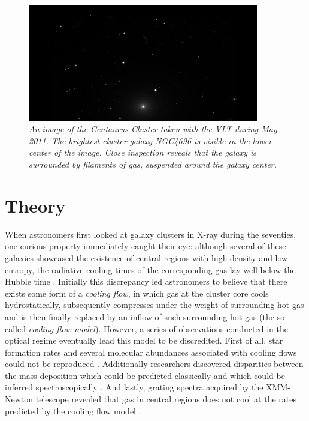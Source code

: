 \documentclass[twoside,single]{lion-msc}
\begin{document}
        \begin{figure}[h]
      \centering
        \includegraphics[width=0.9\textwidth]{NGC4696.jpeg}
      \caption{\textit{An image of the Centaurus Cluster taken with the VLT during May 2011. The brightest cluster galaxy NGC4696 is visible in the lower center of the image. Close inspection reveals that the galaxy is surrounded by filaments of gas, suspended around the galaxy center.}}
      \label{fig:NGC4696}
    \end{figure}
    
    
    
\chapter{Theory}    
    
     When astronomers first looked at galaxy clusters in X-ray during the seventies, one curious property immediately caught their eye: although several of these galaxies showcased the existence of central regions with high density and low entropy, the radiative cooling times of the corresponding gas lay well below the Hubble time \citep{Fabian1977, Lea1973, Cowie1977, Mathews1978}. Initially this discrepancy led astronomers to believe that there exists some form of a \textit{cooling flow}, in which gas at the cluster core cools hydrostatically, subsequently compresses under the weight of surrounding hot gas and is then finally replaced by an inflow of such surrounding hot gas (the so-called \textit{cooling flow model}). However, a series of observations conducted in the optical regime eventually lead this model to be discredited. First of all, star formation rates and several molecular abundances associated with cooling flows could not be reproduced \citep{McNamara1989, Edge2001}. Additionally researchers discovered disparities between the mass deposition which could be predicted classically and which could be inferred spectroscopically \citep{Makishima2001}. And lastly, grating spectra acquired by the XMM-Newton telescope revealed that gas in central regions does not cool at the rates predicted by the cooling flow model \citep{Peterson2001, Peterson2003, Tamura2001, Xu2002}. \\
    
\end{document}

